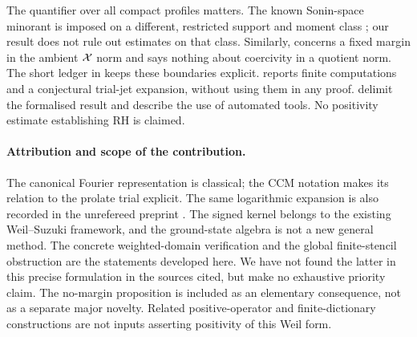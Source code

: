 The quantifier over all compact profiles matters. The known Sonin-space
minorant is imposed on a different, restricted support and moment class
\cite{Connes2026,CC-WEILPOS-2020}; our result does not rule out estimates
on that class. Similarly,  concerns a fixed margin in
the ambient $\mathcal X$ norm and says nothing about coercivity in a quotient
norm. The short ledger in  keeps these boundaries
explicit.  reports finite computations and a
conjectural trial-jet expansion, without using them in any proof.
 delimit the formalised result and describe
the use of automated tools. No positivity estimate establishing RH is
claimed.

\paragraph{Attribution and scope of the contribution.}
The canonical Fourier representation is classical; the CCM notation
makes its relation to the prolate trial explicit. The same logarithmic
expansion is also recorded in the unrefereed preprint
\cite{Freedman2026}. The signed kernel belongs to the existing
Weil--Suzuki framework, and the ground-state algebra is not a new
general method. The concrete weighted-domain verification and the
global finite-stencil obstruction are the statements developed here.
We have not found the latter in this precise formulation in the sources
cited, but make no exhaustive priority claim. The no-margin proposition
is included as an elementary consequence, not as a separate major
novelty. Related positive-operator and finite-dictionary constructions
\cite{Li2024,Groskin2026} are not inputs asserting positivity of this
Weil form.
